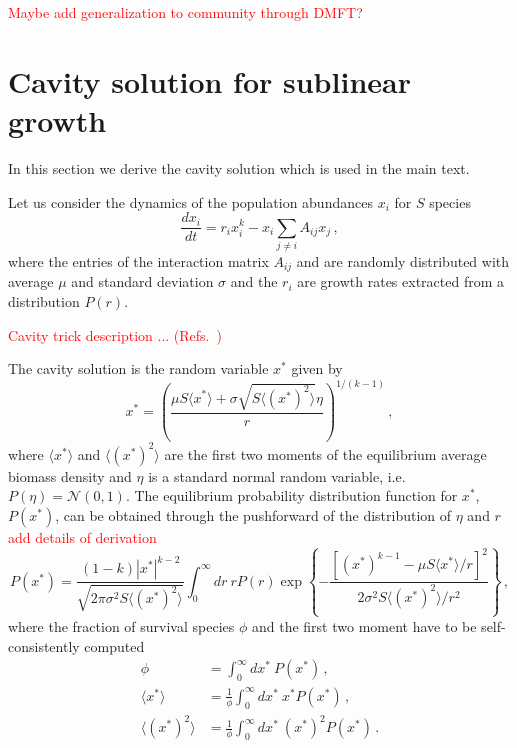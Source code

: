 \documentclass[10pt]{article}
\begin{document}
\textcolor{red}{Maybe add generalization to community through DMFT?}

\section{Cavity solution for sublinear growth}
\label{sec: cavity solution}
In this section we derive the cavity solution which is used in the main text.

Let us consider the dynamics of the population abundances $x_i$ for $S$ species
\begin{equation}
    \frac{d x_i}{dt} = r_ix_i^k - x_i\sum_{j\neq i}A_{ij}x_j \, ,
    \label{eq: full system}
\end{equation}
where the entries of the interaction matrix $A_{ij}$ 
and are randomly distributed with average $\mu$ and standard deviation $\sigma$
and the $r_i$ are growth rates extracted from a distribution $P(r)$. 

\textcolor{red}{Cavity trick description ... 
(Refs.~\cite{Bunin2017,Barbier18,Barbier17,Advani2018,Cui2020})}


The cavity solution is the random variable $x^*$ given by
\begin{equation}
    x^* = \left(\frac{\mu S \langle x^* \rangle + \sigma \sqrt{S\langle (x^*)^2\rangle} \eta}
    {r}\right)^{1/(k-1)} \, ,
    \label{eq: cavity solution}
\end{equation}
where $\langle x^*\rangle$ and $\langle (x^*)^2\rangle$ are 
the first two moments of the equilibrium average biomass density
and $\eta$ is a standard normal random variable, i.e. $P(\eta)=\mathcal N (0,1)$.
The equilibrium probability distribution function for $x^*$, $P(x^*)$,
can be obtained through the pushforward of the distribution of $\eta$ and $r$
\textcolor{red}{add details of derivation}
\begin{equation}
    P(x^*)=\frac{(1-k)|x^*|^{k-2}}{\sqrt{2\pi \sigma^2 S\langle (x^*)^2 \rangle}}
    \int_0^{\infty}dr \ r P(r)
    \exp{\left\{-\frac{\left[(x^*)^{k-1}-\mu S\langle x^*\rangle/r\right]^2}{2\sigma^2S\langle (x^*)^2 \rangle/r^2}\right\}} \, ,
\end{equation}
where the fraction of survival species $\phi$ and the first two moment
have to be self-consistently computed
\begin{align}
    \phi&= \int_0^{\infty}dx^* \ P(x^*)\, , \nonumber \\
    \langle x^*\rangle&=\frac{1}{\phi}\int_0^{\infty}dx^* \ x^*P(x^*) \, , \label{eq: self-consistenty}\\
    \langle (x^*)^2\rangle&=\frac{1}{\phi}\int_0^{\infty}dx^* \ (x^*)^2 P(x^*) \, . \nonumber
\end{align}
\end{document}

